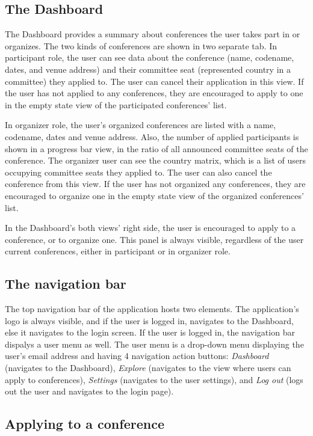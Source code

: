 \subsection{The Dashboard}

The Dashboard provides a summary about conferences the user takes part in or organizes. The two kinds of conferences are shown in two separate tab. In participant role, the user can see data about the conference (name, codename, dates, and venue address) and their committee seat (represented country in a committee) they applied to. The user can cancel their application in this view. If the user has not applied to any conferences, they are encouraged to apply to one in the empty state view of the participated conferences' list.

In organizer role, the user's organized conferences are listed with a name, codename, dates and venue address. Also, the number of applied participants is shown in a progress bar view, in the ratio of all announced committee seats of the conference. The organizer user can see the country matrix, which is a list of users occupying committee seats they applied to. The user can also cancel the conference from this view. If the user has not organized any conferences, they are encouraged to organize one in the empty state view of the organized conferences' list.

In the Dashboard's both views' right side, the user is encouraged to apply to a conference, or to organize one. This panel is always visible, regardless of the user current conferences, either in participant or in organizer role.

\subsection{The navigation bar}

The top navigation bar of the application hosts two elements. The application's logo is always visible, and if the user is logged in, navigates to the Dashboard, else it navigates to the login screen. If the user is logged in, the navigation bar dispalys a user menu as well. The user menu is a drop-down menu displaying the user's email address and having 4 navigation action buttons: \emph{Dashboard} (navigates to the Dashboard), \emph{Explore} (navigates to the view where users can apply to conferences), \emph{Settings} (navigates to the user settings), and \emph{Log out} (logs out the user and navigates to the login page).

\subsection{Applying to a conference}

